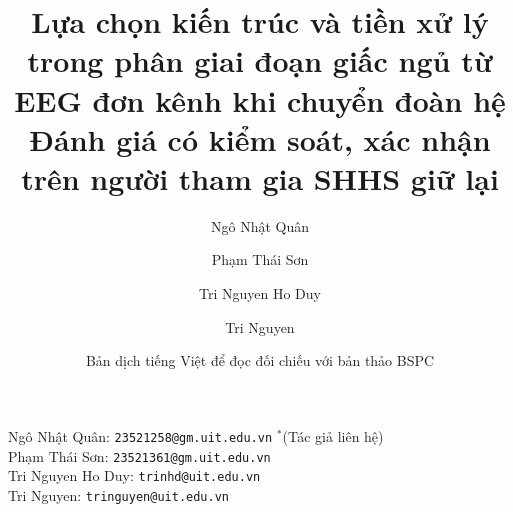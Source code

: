 \documentclass[11pt,a4paper]{article}
\begin{document}
\renewcommand{\abstractname}{Tóm tắt}
\renewcommand{\refname}{Tài liệu tham khảo}
\renewcommand{\figurename}{Hình}
\renewcommand{\tablename}{Bảng}

\title{\bfseries\LARGE Lựa chọn kiến trúc và tiền xử lý trong phân giai đoạn giấc ngủ từ EEG đơn kênh khi chuyển đoàn hệ\\[0.2em]\Large Đánh giá có kiểm soát, xác nhận trên người tham gia SHHS giữ lại}
\author[a,$\ast$]{Ngô Nhật Quân}
\author[a]{Phạm Thái Sơn}
\author[a]{Tri Nguyen Ho Duy}
\author[a]{Tri Nguyen}

\date{\small Bản dịch tiếng Việt để đọc đối chiếu với bản thảo BSPC}

\maketitle
\thispagestyle{empty}

\vspace{-1.0em}
\begin{center}
\small
Ngô Nhật Quân: \texttt{23521258@gm.uit.edu.vn} $^{\ast}$(Tác giả liên hệ) \\[0.2em]
Phạm Thái Sơn: \texttt{23521361@gm.uit.edu.vn} \\[0.2em]
Tri Nguyen Ho Duy: \texttt{trinhd@uit.edu.vn} \\[0.2em]
Tri Nguyen: \texttt{tringuyen@uit.edu.vn}
\end{center}

\vspace{0.2em}
\end{document}
